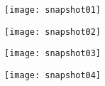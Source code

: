 \begin{figure}[h]
  \centering
  \texttt{[image: snapshot01]}
\end{figure}

\begin{figure}[h]
  \centering
  \texttt{[image: snapshot02]}
\end{figure}

\begin{figure}[h]
  \centering
  \texttt{[image: snapshot03]}
\end{figure}

\begin{figure}[h]
  \centering
  \texttt{[image: snapshot04]}
\end{figure}
